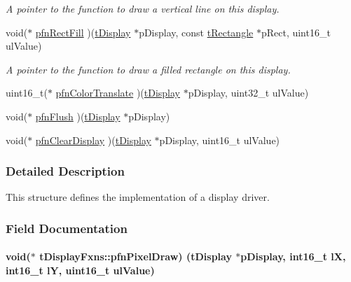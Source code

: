 \begin{DoxyCompactItemize}
\begin{DoxyCompactList}\small\item\em A pointer to the function to draw a vertical line on this display. \end{DoxyCompactList}\item 
void($\ast$ \hyperlink{structt_display_fxns_a161a515401ad8e9627ec5f0c84f413c9}{pfn\+Rect\+Fill} )(\hyperlink{structt_display}{t\+Display} $\ast$p\+Display, const \hyperlink{structt_rectangle}{t\+Rectangle} $\ast$p\+Rect, uint16\+\_\+t ul\+Value)
\begin{DoxyCompactList}\small\item\em A pointer to the function to draw a filled rectangle on this display. \end{DoxyCompactList}\item 
uint16\+\_\+t($\ast$ \hyperlink{structt_display_fxns_ac35ce70cabfe85d0265c064ecd2fbfa8}{pfn\+Color\+Translate} )(\hyperlink{structt_display}{t\+Display} $\ast$p\+Display, uint32\+\_\+t ul\+Value)
\item 
void($\ast$ \hyperlink{structt_display_fxns_a1a96d7181f6226e269fc55186121857d}{pfn\+Flush} )(\hyperlink{structt_display}{t\+Display} $\ast$p\+Display)
\item 
void($\ast$ \hyperlink{structt_display_fxns_a823e2142ba4dea428121839c52ea76aa}{pfn\+Clear\+Display} )(\hyperlink{structt_display}{t\+Display} $\ast$p\+Display, uint16\+\_\+t ul\+Value)
\end{DoxyCompactItemize}


\subsubsection{Detailed Description}
This structure defines the implementation of a display driver. 

\subsubsection{Field Documentation}
\paragraph[{pfn\+Pixel\+Draw}]{\setlength{\rightskip}{0pt plus 5cm}void($\ast$ t\+Display\+Fxns\+::pfn\+Pixel\+Draw) ({\bf t\+Display} $\ast$p\+Display, int16\+\_\+t l\+X, int16\+\_\+t l\+Y, uint16\+\_\+t ul\+Value)}\label{structt_display_fxns_aba4cb20d0c76f62c3b4a81e5887bc4f2}


